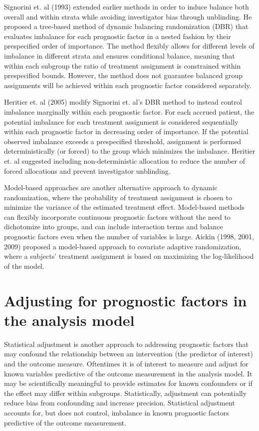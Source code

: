 Signorini et. al (1993) extended earlier methods in order to induce balance both overall and within strata while avoiding investigator bias through unblinding.  
He proposed a tree-based method of dynamic balancing randomization (DBR) that evaluates imbalance for each prognostic factor in a nested fashion by their prespecified order of importance.  
The method flexibly allows for different levels of imbalance in different strata and ensures conditional balance, meaning that within each subgroup the ratio of treatment assignment is constrained within prespecified bounds.  
However, the method does not guarantee balanced group assignments will be achieved within each prognostic factor considered separately. 

Heritier et. al (2005) modify Signorini et. al’s DBR method to instead control imbalance marginally within each prognostic factor.
For each accrued patient, the potential imbalance for each treatment assignment is considered sequentially within each prognostic factor in decreasing order of importance.  
If the potential observed imbalance exceeds a prespecified threshold, assignment is performed deterministically (or forced) to the group which minimizes the imbalance.  
Heritier et. al suggested including non-deterministic allocation to reduce the number of forced allocations and prevent investigator unblinding.

Model-based approaches are another alternative approach to dynamic randomization, where the probability of treatment assignment is chosen to minimize the variance of the estimated treatment effect. 
Model-based methods can flexibly incorporate continuous prognostic factors without the need to dichotomize into groups, and can include interaction terms and balance prognostic factors even when the number of variables is large.  
Aickin (1998, 2001, 2009) proposed a model-based approach to covariate adaptive randomization, where a subjects’ treatment assignment is based on maximizing the log-likelihood of the model. 

\section{Adjusting for prognostic factors in the analysis model}
Statistical adjustment is another approach to addressing prognostic factors that may confound the relationship between an intervention (the predictor of interest) and the outcome measure.
Oftentimes it is of interest to measure and adjust for known variables predictive of the outcome measurement in the analysis model. 
It may be scientifically meaningful to provide estimates for known confounders or if the effect may differ within subgroups. 
Statistically, adjustment can potentially reduce bias from confounding and increase precision.
Statistical adjustment accounts for, but does not control, imbalance in known prognostic factors predictive of the outcome measurement. 

